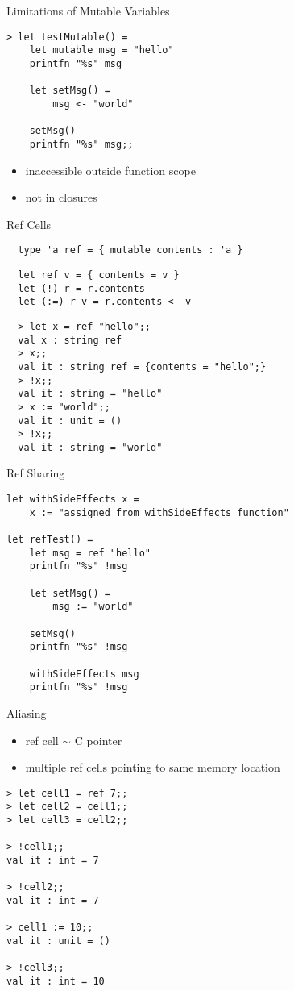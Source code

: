 \documentclass{beamer}
\begin{document}
\begin{frame}[fragile]{Limitations of Mutable Variables}
  \begin{verbatim}
> let testMutable() =
    let mutable msg = "hello"
    printfn "%s" msg

    let setMsg() =
        msg <- "world"

    setMsg()
    printfn "%s" msg;;
  \end{verbatim}
  \pause
  \begin{itemize}
    \item inaccessible outside function scope
    \item not in closures
  \end{itemize}
\end{frame}

\begin{frame}[fragile]{Ref Cells}
  \begin{verbatim}
  type 'a ref = { mutable contents : 'a }
  \end{verbatim}
  \pause
  \begin{verbatim}
  let ref v = { contents = v }
  let (!) r = r.contents
  let (:=) r v = r.contents <- v
  \end{verbatim}
  \pause
  \begin{verbatim}
  > let x = ref "hello";;
  val x : string ref
  > x;;
  val it : string ref = {contents = "hello";}
  > !x;;
  val it : string = "hello"
  > x := "world";;
  val it : unit = ()
  > !x;;
  val it : string = "world"
  \end{verbatim}
\end{frame}

\begin{frame}[fragile]{Ref Sharing}
  \begin{verbatim}
let withSideEffects x =
    x := "assigned from withSideEffects function"
 
let refTest() =
    let msg = ref "hello"
    printfn "%s" !msg
 
    let setMsg() =
        msg := "world"
 
    setMsg()
    printfn "%s" !msg
 
    withSideEffects msg
    printfn "%s" !msg
  \end{verbatim}
\end{frame}

\begin{frame}[fragile]{Aliasing}
  \begin{itemize}[<+->]
    \item ref cell $\sim$ C pointer
    \item multiple ref cells pointing to same memory location
  \end{itemize}
  \pause
  \begin{verbatim}
> let cell1 = ref 7;;
> let cell2 = cell1;;
> let cell3 = cell2;;

> !cell1;;
val it : int = 7

> !cell2;;
val it : int = 7

> cell1 := 10;;
val it : unit = ()

> !cell3;;
val it : int = 10
  \end{verbatim}
\end{frame}
\end{document}
